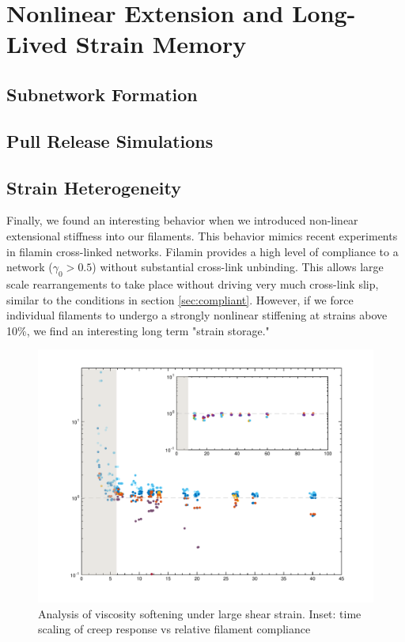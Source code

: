 \documentclass[pre,reprint]{revtex4-1}
\begin{document}
\section{Nonlinear Extension and Long-Lived Strain Memory}

\subsection{Subnetwork Formation}

\subsection{Pull Release Simulations}

\subsection{Strain Heterogeneity}
Finally, we found an interesting behavior when we introduced non-linear extensional stiffness into our filaments.  This behavior mimics recent experiments in filamin cross-linked networks.  Filamin provides a high level of compliance to a network ($\gamma_0>0.5$) without substantial cross-link unbinding.  This allows large scale rearrangements to take place without driving very much cross-link slip, similar to the conditions in section \ref{sec:compliant}.  However, if we force individual filaments to undergo a strongly nonlinear stiffening at strains above 10\%, we find an interesting long term "strain storage."

\begin{figure}[h!]
\centering
\includegraphics[width=\hsize]{eff_vic_master}
\caption{\label{fig:align}Analysis of viscosity softening under large shear strain. Inset: time scaling of creep response vs relative filament compliance  }
\end{figure}
\end{document}
